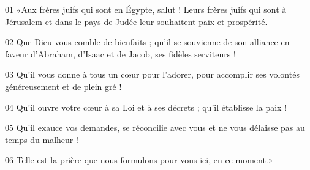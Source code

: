 01 «Aux frères juifs qui sont en Égypte, salut ! Leurs frères juifs qui sont à Jérusalem et dans le pays de Judée leur souhaitent paix et prospérité.

02 Que Dieu vous comble de bienfaits ; qu’il se souvienne de son alliance en faveur d’Abraham, d’Isaac et de Jacob, ses fidèles serviteurs !

03 Qu’il vous donne à tous un cœur pour l’adorer, pour accomplir ses volontés généreusement et de plein gré !

04 Qu’il ouvre votre cœur à sa Loi et à ses décrets ; qu’il établisse la paix !

05 Qu’il exauce vos demandes, se réconcilie avec vous et ne vous délaisse pas au temps du malheur !

06 Telle est la prière que nous formulons pour vous ici, en ce moment.»